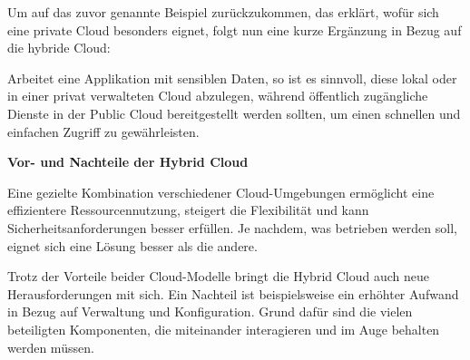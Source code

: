          Um auf das zuvor genannte Beispiel zurückzukommen, das erklärt, wofür sich eine private Cloud besonders eignet, folgt nun eine kurze Ergänzung in Bezug auf die hybride Cloud:
    
        Arbeitet eine Applikation mit sensiblen Daten, so ist es sinnvoll, diese lokal oder in einer privat verwalteten Cloud abzulegen, während öffentlich zugängliche Dienste in der Public Cloud bereitgestellt werden sollten, um einen schnellen und einfachen Zugriff zu gewährleisten. 
    
        \clearpage
    
        \textbf{Vor- und Nachteile der Hybrid Cloud}
    
        Eine gezielte Kombination verschiedener Cloud-Umgebungen ermöglicht eine effizientere Ressourcennutzung, steigert die Flexibilität und kann Sicherheitsanforderungen besser erfüllen. Je nachdem, was betrieben werden soll, eignet sich eine Lösung besser als die andere. 
    
        Trotz der Vorteile beider Cloud-Modelle bringt die Hybrid Cloud auch neue Herausforderungen mit sich.
        Ein Nachteil ist beispielsweise ein erhöhter Aufwand in Bezug auf Verwaltung und Konfiguration. Grund dafür sind die vielen beteiligten Komponenten, die miteinander interagieren und im Auge behalten werden müssen. \cite{EA:Web58}
    